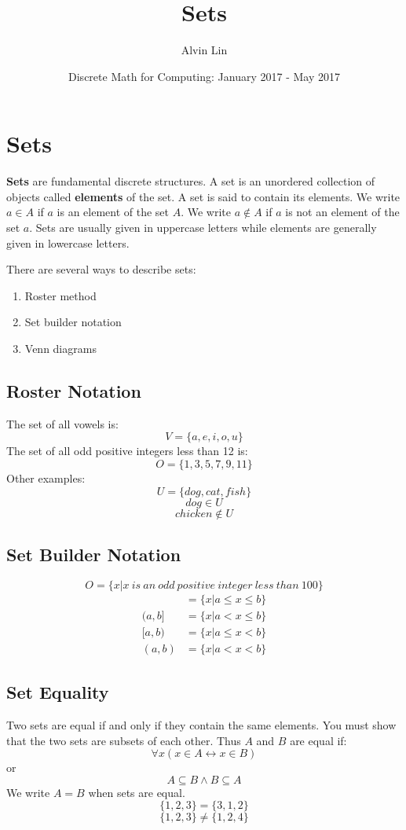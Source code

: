 \documentclass[letterpaper, 12pt]{math}
\title{Sets}
\author{Alvin Lin}
\date{Discrete Math for Computing: January 2017 - May 2017}
\begin{document}
\maketitle

\section*{Sets}
\textbf{Sets} are fundamental discrete structures. A set is an unordered
collection of objects called \textbf{elements} of the set. A set is said
to contain its elements. We write \( a \in A \) if \( a \) is an element of the
set \( A \). We write \( a \notin A \) if \( a \) is not an element of the set
\( a \). Sets are usually given in uppercase letters while elements are
generally given in lowercase letters. \par
There are several ways to describe sets:
\begin{enumerate}
  \item Roster method
  \item Set builder notation
  \item Venn diagrams
\end{enumerate}

\subsection*{Roster Notation}
The set of all vowels is:
\[ V = \bigg\{a,e,i,o,u\bigg\} \]
The set of all odd positive integers less than 12 is:
\[ O = \bigg\{1,3,5,7,9,11\bigg\} \]
Other examples:
\[ U = \bigg\{dog,cat,fish\bigg\} \]
\[ dog \in U \]
\[ chicken \notin U \]

\subsection*{Set Builder Notation}
\[ O = \bigg\{x|x\ is\ an\ odd\ positive\ integer\ less\ than\ 100\bigg\} \]
\begin{align*}
  [a,b] &= \bigg\{x|a \leq x \leq b \bigg\} \\
  (a,b] &= \bigg\{x|a < x \leq b \bigg\} \\
  [a,b) &= \bigg\{x|a \leq x < b \bigg\} \\
  (a,b) &= \bigg\{x|a < x < b \bigg\}
\end{align*}

\subsection*{Set Equality}
Two sets are equal if and only if they contain the same elements. You must show
that the two sets are subsets of each other. Thus \( A \) and \( B \) are equal
if:
\[ \forall{x}(x \in A \leftrightarrow x \in B) \]
or
\[ A \subseteq B \wedge B \subseteq A \]
We write \( A = B \) when sets are equal.
\[ \bigg\{1,2,3\bigg\} = \bigg\{3,1,2\bigg\} \]
\[ \bigg\{1,2,3\bigg\} \neq \bigg\{1,2,4\bigg\} \]
\end{document}
